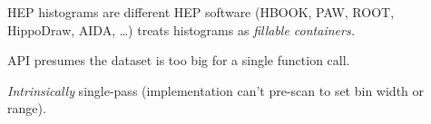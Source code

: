 \documentclass[aspectratio=169]{beamer}
\begin{document}
\begin{frame}[fragile]{HEP histograms are different}
\vspace{0.5 cm}
HEP software (HBOOK, PAW, ROOT, HippoDraw, AIDA, \ldots) treats histograms as {\it fillable containers.}

\vspace{0.25 cm}
\begin{center}
\end{center}

\vspace{0.25 cm}
API presumes the dataset is too big for a single function call.

\vspace{0.25 cm}
{\it Intrinsically} single-pass (implementation can't pre-scan to set bin width or range).


\end{frame}
\end{document}
